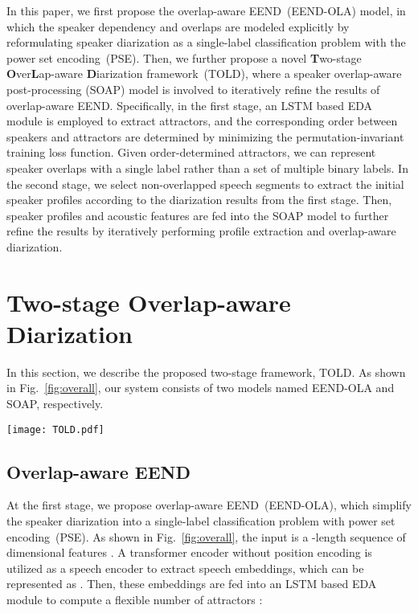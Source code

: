 \documentclass{article}
\begin{document}
In this paper, we first propose the overlap-aware EEND~(EEND-OLA) model, in which the speaker dependency and overlaps are modeled explicitly by reformulating speaker diarization as a single-label classification problem with the power set encoding~(PSE).
Then, we further propose a novel \textbf{T}wo-stage \textbf{O}ver\textbf{L}ap-aware \textbf{D}iarization framework~(TOLD), where a speaker overlap-aware post-processing (SOAP) model is involved to iteratively refine the results of overlap-aware EEND.
Specifically, in the first stage, an LSTM based EDA module is employed to extract attractors, and the corresponding order between speakers and attractors are determined by minimizing the permutation-invariant training loss function. Given order-determined attractors, we can represent speaker overlaps with a single label rather than a set of multiple binary labels. In the second stage, we select non-overlapped speech segments to extract the initial speaker profiles according to the diarization results from the first stage. Then, speaker profiles and acoustic features are fed into the SOAP model to further refine the results by iteratively performing profile extraction and overlap-aware diarization.

\section{Two-stage Overlap-aware Diarization}
In this section, we describe the proposed two-stage framework, TOLD. As shown in Fig.~\ref{fig:overall}, our system consists of two models named EEND-OLA and SOAP, respectively.




\begin{figure*}[htb]
  \centering
  \texttt{[image: TOLD.pdf]}
  \caption{The overall architecture of the proposed method, TOLD, where  denotes concatenation operation.}
  \label{fig:overall}
\end{figure*}

\subsection{Overlap-aware EEND}
\label{sec:first_stage}
At the first stage, we propose overlap-aware EEND~(EEND-OLA), which simplify the speaker diarization into a single-label classification problem with power set encoding~(PSE). As shown in Fig.~\ref{fig:overall}, the input is a -length sequence of  dimensional features . A transformer encoder without position encoding is utilized as a speech encoder to extract speech embeddings, which can be represented as . Then, these embeddings are fed into an LSTM based EDA module to compute a flexible number of attractors :
\end{document}
